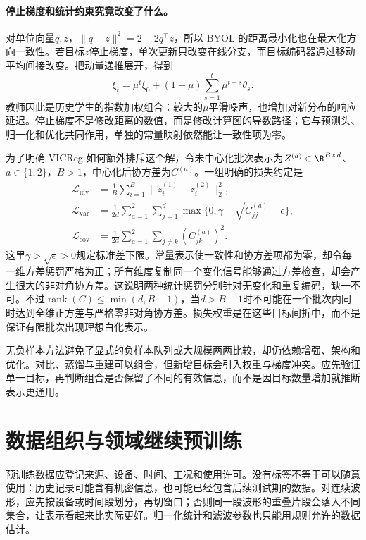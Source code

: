 \paragraph{停止梯度和统计约束究竟改变了什么。}
对单位向量$q,z$，$\|q-z\|^2=2-2q^\top z$，所以 BYOL 的距离最小化也在最大化方向一致性。若目标$z$停止梯度，单次更新只改变在线分支，而目标编码器通过移动平均间接改变。把动量递推展开，得到
\begin{equation}
 \xi_t=\mu^t\xi_0+(1-\mu)\sum_{s=1}^t\mu^{t-s}\theta_s.
\end{equation}
教师因此是历史学生的指数加权组合：较大的$\mu$平滑噪声，也增加对新分布的响应延迟。停止梯度不是修改距离的数值，而是修改计算图的导数路径；它与预测头、归一化和优化共同作用，单独的常量映射依然能让一致性项为零。

为了明确 VICReg 如何额外排斥这个解，令未中心化批次表示为$Z^{(a)}\in\R^{B\times d}$、$a\in\{1,2\}$，$B>1$，中心化后协方差为$C^{(a)}$。一组明确的损失约定是
\begin{align}
 \mathcal L_{\mathrm{inv}}&=\frac1B\sum_{i=1}^B\|z_i^{(1)}-z_i^{(2)}\|_2^2,\\
 \mathcal L_{\mathrm{var}}&=\frac1{2d}\sum_{a=1}^2\sum_{j=1}^d
 \max\{0,\gamma-\sqrt{C_{jj}^{(a)}+\epsilon}\},\\
 \mathcal L_{\mathrm{cov}}&=\frac1{2d}\sum_{a=1}^2\sum_{j\ne k}(C_{jk}^{(a)})^2.
\end{align}
这里$\gamma>\sqrt\epsilon>0$规定标准差下限。常量表示使一致性和协方差项都为零，却令每一维方差惩罚严格为正；所有维度复制同一个变化信号能够通过方差检查，却会产生很大的非对角协方差。这说明两种统计惩罚分别针对无变化和重复编码，缺一不可。不过$\operatorname{rank}(C)\leq\min(d,B-1)$，当$d>B-1$时不可能在一个批次内同时达到全维正方差与严格零非对角协方差。损失权重是在这些目标间折中，而不是保证有限批次出现理想白化表示。

无负样本方法避免了显式的负样本队列或大规模两两比较，却仍依赖增强、架构和优化。对比、蒸馏与重建可以组合，但新增目标会引入权重与梯度冲突。应先验证单一目标，再判断组合是否保留了不同的有效信息，而不是因目标数量增加就推断表示更通用。

\section{数据组织与领域继续预训练}
预训练数据应登记来源、设备、时间、工况和使用许可。没有标签不等于可以随意使用：历史记录可能含有机密信息，也可能已经包含后续测试期的数据。对连续波形，应先按设备或时间段划分，再切窗口；否则同一段波形的重叠片段会落入不同集合，让表示看起来比实际更好。归一化统计和滤波参数也只能用规则允许的数据估计。

